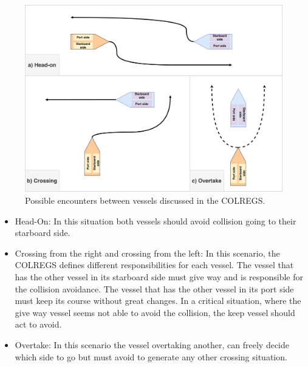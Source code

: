     \begin{figure}[H]
        \centering
        \includegraphics[scale=0.125]{figs/Chap2/Encounters.pdf}
        \caption{Possible encounters between vessels discussed in the COLREGS.}
        \label{fig:chap2_encounters}
    \end{figure}
    
    \begin{itemize}
        \item Head-On: In this situation both vessels should avoid collision going to their starboard side.
        \item Crossing from the right and crossing from the left: In this scenario, the COLREGS defines different responsibilities for each vessel. The vessel that has the other vessel in its starboard side must give way and is responsible for the collision avoidance. The vessel that has the other vessel in its port side must keep its course without great changes. In a critical situation, where the give way vessel seems not able to avoid the collision, the keep vessel should act to avoid.
        \item Overtake: In this scenario the vessel overtaking another, can freely decide which side to go but must avoid to generate any other crossing situation.
    \end{itemize}

    
